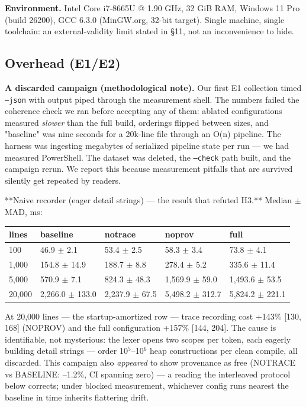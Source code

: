 \textbf{Environment.} Intel Core i7-8665U @ 1.90 GHz, 32 GiB RAM,
Windows 11 Pro (build 26200), GCC 6.3.0 (MinGW.org, 32-bit target).
Single machine, single toolchain: an external-validity limit stated
in \S11, not an inconvenience to hide.

\subsection{Overhead (E1/E2)}

\textbf{A discarded campaign (methodological note).} Our first E1
collection timed \texttt{--json} with output piped through the measurement
shell. The numbers failed the coherence check we ran before accepting
any of them: ablated configurations measured \emph{slower} than the full
build, orderings flipped between sizes, and "baseline" was nine
seconds for a 20k-line file through an O(n) pipeline. The harness was
ingesting megabytes of serialized pipeline state per run --- we had
measured PowerShell. The dataset was deleted, the \texttt{--check} path
built, and the campaign rerun. We report this because measurement
pitfalls that are survived silently get repeated by readers.

**Naive recorder (eager detail strings) --- the result that refuted
H3.** Median $\pm$ MAD, ms:

\begin{table}[t]
\centering
\small
\begin{tabular}{lllll}
\toprule
lines & baseline & notrace & noprov & full \\
\midrule
100 & 46.9 $\pm$ 2.1 & 53.4 $\pm$ 2.5 & 58.3 $\pm$ 3.4 & 73.8 $\pm$ 4.1 \\
1,000 & 154.8 $\pm$ 14.9 & 188.7 $\pm$ 8.8 & 278.4 $\pm$ 5.2 & 335.6 $\pm$ 11.4 \\
5,000 & 570.9 $\pm$ 7.1 & 824.3 $\pm$ 48.3 & 1,569.9 $\pm$ 59.0 & 1,493.6 $\pm$ 53.5 \\
20,000 & 2,266.0 $\pm$ 133.0 & 2,237.9 $\pm$ 67.5 & 5,498.2 $\pm$ 312.7 & 5,824.2 $\pm$ 221.1 \\
\bottomrule
\end{tabular}
\end{table}

At 20,000 lines --- the startup-amortized row --- trace recording cost
+143\% [130, 168] (NOPROV) and the full configuration +157\%
[144, 204]. The cause is identifiable, not mysterious: the lexer
opens two scopes per token, each eagerly building detail strings ---
order 10$^5$--10$^6$ heap constructions per clean compile, all discarded.
This campaign also \emph{appeared} to show provenance as free (NOTRACE vs
BASELINE: --1.2\%, CI spanning zero) --- a reading the interleaved
protocol below corrects; under blocked measurement, whichever config
runs nearest the baseline in time inherits flattering drift.


